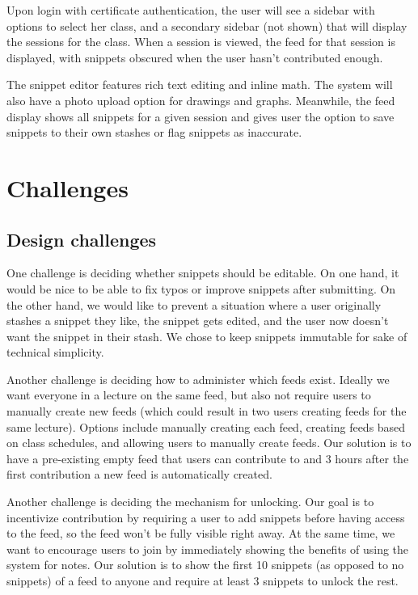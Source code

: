 \documentclass{article}
\begin{document}
Upon login with certificate authentication, the user will see a sidebar with options to select her class, and a secondary sidebar (not shown) that will display the sessions for the class. When a session is viewed, the feed for that session is displayed, with snippets obscured when the user hasn't contributed enough. 

The snippet editor features rich text editing and inline math. The system will also have a photo upload option for drawings and graphs. Meanwhile, the feed display shows all snippets for a given session and gives user the option to save snippets to their own stashes or flag snippets as inaccurate.

\section*{Challenges}
\subsection*{Design challenges}
One challenge is deciding whether snippets should be editable. On one hand, it would be nice to be able to fix typos or improve snippets after submitting. On the other hand, we would like to prevent a situation where a user originally stashes a snippet they like, the snippet gets edited, and the user now doesn't want the snippet in their stash. We chose to keep snippets immutable for sake of technical simplicity.

Another challenge is deciding how to administer which feeds exist. Ideally we want everyone in a lecture on the same feed, but also not require users to manually create new feeds (which could result in two users creating feeds for the same lecture). Options include manually creating each feed, creating feeds based on class schedules, and allowing users to manually create feeds. Our solution is to have a pre-existing empty feed that users can contribute to and 3 hours after the first contribution a new feed is automatically created.

Another challenge is deciding the mechanism for unlocking. Our goal is to incentivize contribution by requiring a user to add snippets before having access to the feed, so the feed won't be fully visible right away. At the same time, we want to encourage users to join by immediately showing the benefits of using the system for notes. Our solution is to show the first 10 snippets (as opposed to no snippets) of a feed to anyone and require at least 3 snippets to unlock the rest.
\end{document}
